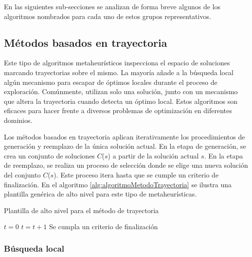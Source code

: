 En las siguientes sub-secciones se analizan de forma breve algunos de los algoritmos nombrados para cada uno de estos grupos representativos.


\subsection{Métodos basados en trayectoria}

Este tipo de algoritmos metaheurísticos inspecciona el espacio de soluciones marcando trayectorias sobre el mismo. La mayoría añade a la búsqueda local algún mecanismo para escapar de óptimos locales durante el proceso de exploración. Comúnmente, utilizan solo una solución, junto con un mecanismo que altera la trayectoria cuando detecta un óptimo local. Estos algoritmos son eficaces para hacer frente a diversos problemas de optimización en diferentes dominios.

Los métodos basados en trayectoria aplican iterativamente los procedimientos de generación y reemplazo de la única solución actual. En la etapa de generación, se crea un conjunto de soluciones $C$($s$) a partir de la solución actual $s$. En la etapa de reemplazo, se realiza un proceso de selección donde se elige una nueva solución del conjunto $C$($s$). Este proceso itera hasta que se cumple un criterio de finalización. En el algoritmo \ref{alg:algoritmoMetodoTrayectoria} se ilustra una plantilla genérica de alto nivel para este tipo de metaheurísticas.

\begin{algorithm} [H]
    \caption{Plantilla de alto nivel para el método de trayectoria} 
    \label{alg:algoritmoMetodoTrayectoria} 
    \begin{algorithmic} [1]
        \State $t=0$
        \Repeat
            \State $t=t+1$
        \Until Se cumpla un criterio de finalización
    \end{algorithmic}
\end{algorithm}

\subsubsection{Búsqueda local}

